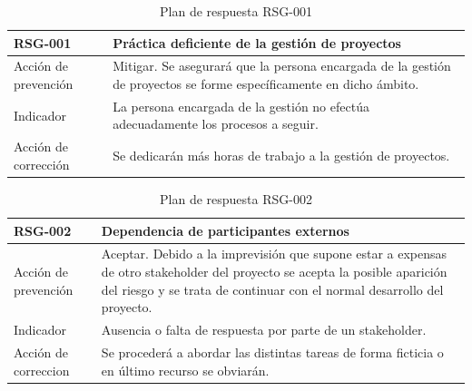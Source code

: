 \begin{table}[htpb]
\centering
\caption{Plan de respuesta RSG-001}
\begin{tabularx}{\textwidth}{|l|X|}
\hline
RSG-001              & Práctica deficiente de la gestión de proyectos                                                                      \\ \hline
Acción de prevención & Mitigar. Se asegurará que la persona encargada de la gestión de proyectos se forme específicamente en dicho ámbito. \\ \hline
Indicador            & La persona encargada de la gestión no efectúa adecuadamente los procesos a seguir.                                  \\ \hline
Acción de corrección & Se dedicarán más horas de trabajo a la gestión de proyectos.                                                        \\ \hline
\end{tabularx}
\end{table}


\begin{table}[htpb]
\centering
\caption{Plan de respuesta RSG-002}
\begin{tabularx}{\textwidth}{|l|X|}
\hline
RSG-002              & Dependencia de participantes externos                                                                                                                                                                  \\ \hline
Acción de prevención & Aceptar. Debido a la imprevisión que supone estar a expensas de otro stakeholder del proyecto se acepta la posible aparición del riesgo y se trata de continuar con el normal desarrollo del proyecto. \\ \hline
Indicador            & Ausencia o falta de respuesta por parte de un stakeholder.                                                                                                                                             \\ \hline
Acción de correccion & Se procederá a abordar las distintas tareas de forma ficticia o en último recurso se obviarán.                                                                                                        \\ \hline
\end{tabularx}
\end{table}



